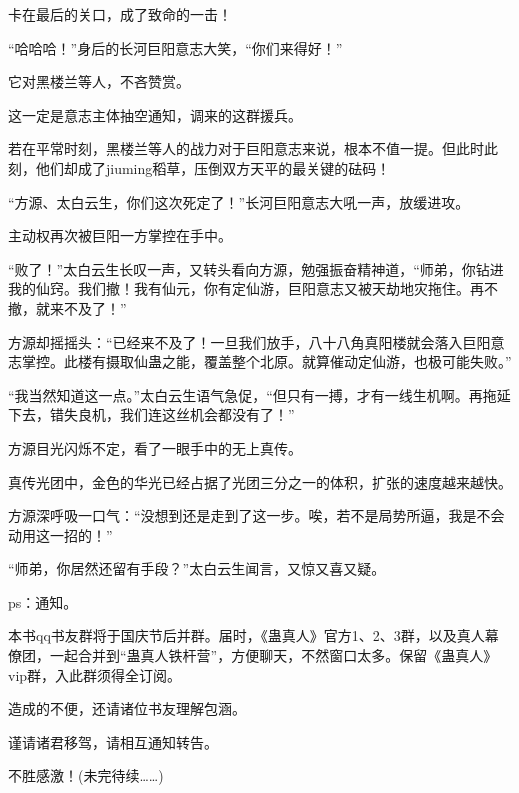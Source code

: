 \begin{this_body}
卡在最后的关口，成了致命的一击！

“哈哈哈！”身后的长河巨阳意志大笑，“你们来得好！”

它对黑楼兰等人，不吝赞赏。

这一定是意志主体抽空通知，调来的这群援兵。

若在平常时刻，黑楼兰等人的战力对于巨阳意志来说，根本不值一提。但此时此刻，他们却成了jiuming稻草，压倒双方天平的最关键的砝码！

“方源、太白云生，你们这次死定了！”长河巨阳意志大吼一声，放缓进攻。

主动权再次被巨阳一方掌控在手中。

“败了！”太白云生长叹一声，又转头看向方源，勉强振奋精神道，“师弟，你钻进我的仙窍。我们撤！我有仙元，你有定仙游，巨阳意志又被天劫地灾拖住。再不撤，就来不及了！”

方源却摇摇头：“已经来不及了！一旦我们放手，八十八角真阳楼就会落入巨阳意志掌控。此楼有摄取仙蛊之能，覆盖整个北原。就算催动定仙游，也极可能失败。”

“我当然知道这一点。”太白云生语气急促，“但只有一搏，才有一线生机啊。再拖延下去，错失良机，我们连这丝机会都没有了！”

方源目光闪烁不定，看了一眼手中的无上真传。

真传光团中，金色的华光已经占据了光团三分之一的体积，扩张的速度越来越快。

方源深呼吸一口气：“没想到还是走到了这一步。唉，若不是局势所逼，我是不会动用这一招的！”

“师弟，你居然还留有手段？”太白云生闻言，又惊又喜又疑。

ps：通知。

本书qq书友群将于国庆节后并群。届时，《蛊真人》官方1、2、3群，以及真人幕僚团，一起合并到“蛊真人铁杆营”，方便聊天，不然窗口太多。保留《蛊真人》vip群，入此群须得全订阅。

造成的不便，还请诸位书友理解包涵。

谨请诸君移驾，请相互通知转告。

不胜感激！(未完待续……)

\end{this_body}


